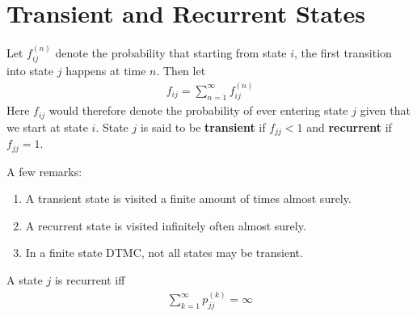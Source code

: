\documentclass[a4paper,10pt,english]{article}
\begin{document}
\section{Transient and Recurrent States}
\begin{defn}
Let $f_{ij}^{(n)}$ denote the probability that starting from state $i$, the first transition into state $j$ happens at time $n$. Then let
\begin{align*}f_{ij} = \sum_{n=1}^\infty f_{ij}^{(n)}\end{align*}
Here $f_{ij}$ would therefore denote the probability of ever entering state $j$ given that we start at state $i$. State $j$ is said to be \textbf{transient} if $f_{jj} < 1$ and \textbf{recurrent} if $f_{jj}=1$. 
\end{defn}
A few remarks:
\begin{enumerate}
	\item A transient state is visited a finite amount of times almost surely.
	\item A recurrent state is visited infinitely often almost surely.
	\item In a finite state DTMC, not all states may be transient. 
\end{enumerate}
\begin{prop}
A state $j$ is recurrent iff
\begin{align*}\sum_{k=1}^\infty p_{jj}^{(k)} = \infty\end{align*}
\end{prop}
\end{document}
